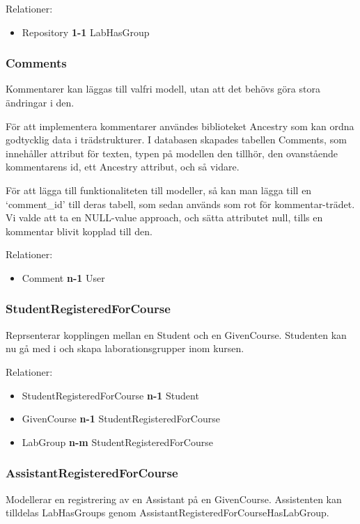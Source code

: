 Relationer: 
\begin{itemize}
  \item Repository {\bf 1-1} LabHasGroup 
\end{itemize}

\subsubsection{Comments}
Kommentarer kan läggas till valfri modell, utan att det behövs göra stora ändringar i den. 

För att implementera kommentarer användes biblioteket Ancestry som kan ordna godtycklig data i trädstrukturer. I databasen skapades tabellen Comments, som innehåller attribut för texten, typen på modellen den tillhör, den ovanstående kommentarens id, ett Ancestry attribut, och så vidare. 

För att lägga till funktionaliteten till modeller, så kan man lägga till en ‘comment\_id’ till deras tabell, som sedan används som rot för kommentar-trädet. Vi valde att ta en NULL-value approach, och sätta attributet null, tills en kommentar blivit kopplad till den.

Relationer: 
\begin{itemize}
  \item Comment {\bf n-1} User 
\end{itemize}
    
\subsubsection{StudentRegisteredForCourse}
Reprsenterar kopplingen mellan en Student och en GivenCourse. Studenten kan nu gå med i och skapa  laborationsgrupper inom kursen.

Relationer: 
\begin{itemize}
  \item StudentRegisteredForCourse {\bf n-1} Student 
  \item GivenCourse {\bf n-1} StudentRegisteredForCourse
  \item LabGroup {\bf n-m } StudentRegisteredForCourse
\end{itemize}

\subsubsection{AssistantRegisteredForCourse}
Modellerar en registrering av en Assistant på en GivenCourse. Assistenten kan tilldelas LabHasGroups genom AssistantRegisteredForCourseHasLabGroup.

